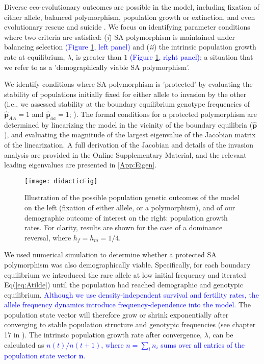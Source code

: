 \documentclass[11pt]{article}
\def\mbf#1{\mathbf{#1}}
\begin{document}
Diverse eco-evolutionary outcomes are possible in the model, including fixation of either allele, balanced polymorphism, population growth or extinction, and even evolutionary rescue and suicide \citep[see][for examples of the possible outcomes]{deVriesCaswell2019a, deVriesCaswell2019b}. We focus on identifying parameter conditions where two criteria are satisfied: ({\itshape i}) SA polymorphism is maintained under balancing selection \textcolor{blue}{(Figure \ref{fig:didactic}, left panel)} and ({\itshape ii}) the intrinsic population growth rate at equilibrium, $\lambda$, is greater than $1$ \textcolor{blue}{(Figure \ref{fig:didactic}, right panel)}; a situation that we refer to as a 'demographically viable SA polymorphism'.

We identify conditions where SA polymorphism is 'protected' by evaluating the stability of populations initially fixed for either allele to invasion by the other (i.e., we assessed stability at the boundary equilibrium genotype frequencies of $\hat{\mbf{p}}_{AA} = 1$ and $\hat{\mbf{p}}_{aa} = 1$; \citealt{Levene1953, Prout1968, deVriesCaswell2019b}). The formal conditions for a protected polymorphism are determined by linearizing the model in the vicinity of the boundary equilibria ($\hat{\mbf{p}}$), and evaluating the magnitude of the largest eigenvalue of the Jacobian matrix of the linearization. A full derivation of the Jacobian and details of the invasion analysis are provided in the Online Supplementary Material, and the relevant leading eigenvalues are presented in \ref{App:Eigen}.

 \begin{figure}[htbp]
 \centering
 \texttt{[image: didacticFig]}
 \caption{\footnotesize{Illustration of the possible population genetic outcomes of the model on the left (fixation of either allele, or a polymorphism), and of our demographic outcome of interest on the right:  population growth rates. For clarity, results are shown for the case of a dominance reversal, where $h_f = h_m = 1/4$.}}
 \label{fig:didactic}
 \end{figure}

We used numerical simulation to determine whether a protected SA polymorphism was also demographically viable. Specifically, for each boundary equilibrium we introduced the rare allele at low initial frequency and iterated Eq(\ref{eq:Atilde}) until the population had reached demographic and genotypic equilibrium. \textcolor{blue}{Although we use density-independent survival and fertility rates, the allele frequency dynamics introduce frequency-dependence into the model.} The population state vector will therefore grow or shrink exponentially after converging to stable population structure and genotypic frequencies (see chapter 17 in \citealt{Caswell2001}). The intrinsic population growth rate after convergence, $\lambda$, can be calculated as \textcolor{blue}{ $n(t)/n(t+1)$, where $n = \sum_i n_i $ sums over all entries of the population state vector $\tilde{\mbf{n}}$.}
\end{document}
